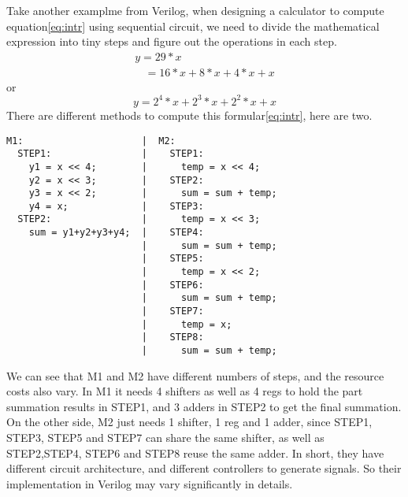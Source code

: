 Take another examplme from Verilog, when designing a calculator to compute equation\eqref{eq:intr} using sequential circuit, we need to divide the mathematical expression into tiny steps and figure out the operations in each step.
%
\begin{equation}\begin{array}{lr}
y = 29 * x \\
\:\:\:\:= 16 * x + 8 * x + 4 * x + x
\end{array}
\end{equation}
or
\begin{equation}
y =  2^4 * x + 2^3 * x + 2^2 * x + x
\label{eq:intr}
\end{equation}
%
There are different methods to compute this formular\eqref{eq:intr}, here are two.
%
\begin{verbatim}
M1:                     |  M2:
  STEP1:                |    STEP1: 
    y1 = x << 4;        |      temp = x << 4;
    y2 = x << 3;        |    STEP2:
    y3 = x << 2;        |      sum = sum + temp;
    y4 = x;             |    STEP3:
  STEP2:                |      temp = x << 3;
    sum = y1+y2+y3+y4;  |    STEP4:
                        |      sum = sum + temp;     
                        |    STEP5:
                        |      temp = x << 2;
                        |    STEP6:
                        |      sum = sum + temp;
                        |    STEP7:
                        |      temp = x;
                        |    STEP8:
                        |      sum = sum + temp;
\end{verbatim}
We can see that M1 and M2 have different numbers of steps, and the resource costs also vary. In M1 it needs 4 shifters as well as 4 regs to hold the part summation results in STEP1, and 3 adders in STEP2 to get the final summation. On the other side, M2 just needs 1 shifter, 1 reg and 1 adder, since STEP1, STEP3, STEP5 and STEP7 can share the same shifter, as well as STEP2,STEP4, STEP6 and STEP8 reuse the same adder.
In short, they have different circuit architecture, and different controllers to generate signals. So their implementation in Verilog may vary significantly in details.

